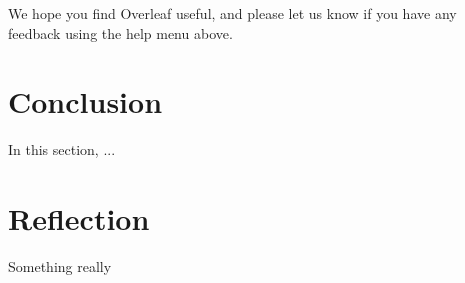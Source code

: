 \documentclass[a4paper]{article}
\begin{document}
We hope you find Overleaf useful, and please let us know if you have any feedback using the help menu above.


\section{Conclusion}
\label{sec:conclusion}
In this section, ...


\section{Reflection}
\label{sec:reflection}
Something really \cite{Mohri_2012}



\end{document}
